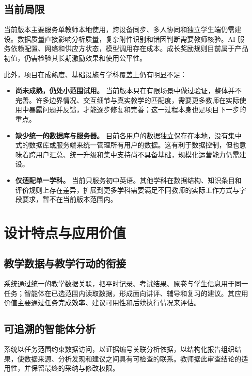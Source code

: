 \documentclass[11pt,a4paper,fontset=none]{ctexart}
\begin{document}
\subsection{当前局限}

当前版本主要服务单教师本地使用，跨设备同步、多人协同和独立学生端仍需建设。数据质量直接影响分析质量，复杂附件识别和错因判断需要教师核验。AI 服务依赖配置、网络和供应方状态，模型调用存在成本。成长奖励规则目前属于产品初值，仍需检验其长期激励效果和使用公平性。

此外，项目在成熟度、基础设施与学科覆盖上仍有明显不足：

\begin{itemize}
\item \textbf{尚未成熟，仍处小范围试用。} 当前版本只在有限场景中做过验证，整体并不完善。许多边界情况、交互细节与真实教学的匹配度，需要更多教师在实际使用中暴露问题并反馈，才能逐步修复和完善；这一过程本身也是项目下一步的重点。
\item \textbf{缺少统一的数据库与服务器。} 目前各用户的数据独立保存在本地，没有集中式的数据库或服务端来统一管理所有用户的数据。这有利于数据控制，但也意味着跨用户汇总、统一升级和集中支持尚不具备基础，规模化运营能力仍需建设。
\item \textbf{仅适配单一学科。} 当前只服务初中英语。其他学科在数据结构、知识条目和评价规则上存在差异，扩展到更多学科需要满足不同教师的实际工作方式与字段要求，暂不在当前版本范围内。
\end{itemize}

\section{设计特点与应用价值}

\subsection{教学数据与教学行动的衔接}

系统通过统一的教学数据关联，把平时记录、考试结果、原卷与学生信息用于同一任务；智能体在已选范围内读取数据，形成面向讲评、辅导和复习的建议。其应用价值主要通过任务完成效率、建议可用性和后续执行情况来评估。

\subsection{可追溯的智能体分析}

系统以任务范围约束数据访问，以证据编号关联分析依据，以结构化报告组织结果，使数据来源、分析发现和建议之间具有可检查的联系。教师据此审查结论的适用性，并保留最终的采纳与修改权限。
\end{document}
